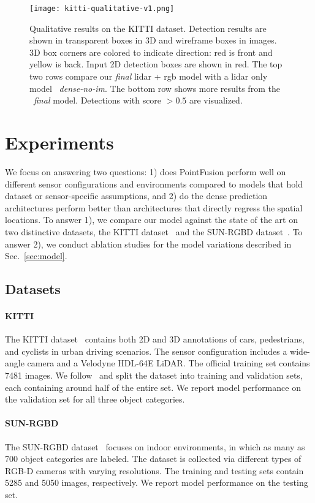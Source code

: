 \documentclass[10pt,twocolumn,letterpaper]{article}
\begin{document}
\begin{figure}[!t]
\centering
\texttt{[image: kitti-qualitative-v1.png]}
\caption{Qualitative results on the KITTI dataset. Detection results are shown in transparent boxes in 3D and wireframe boxes in images. 3D box corners are colored to indicate direction: red is front and yellow is back. Input 2D detection boxes are shown in red. The top two rows compare our \textit{final} lidar + rgb model with a lidar only model ~\textit{dense-no-im}. The bottom row shows more results from the ~\textit{final} model. Detections with score $>0.5$ are visualized.}
\label{fig:kitti-qualitative}
\end{figure}


\section{Experiments}

We focus on answering two questions: 1) does PointFusion perform well on different sensor configurations and environments compared to models that hold dataset or sensor-specific assumptions, and 2) do the dense prediction architectures perform better than architectures that directly regress the spatial locations. To answer 1), we compare our model against the state of the art on two distinctive datasets, the KITTI dataset~\cite{kitti} and the SUN-RGBD dataset~\cite{song2015sun}. To answer 2), we conduct ablation studies for the model variations described in Sec.~\ref{sec:model}.

\subsection{Datasets}
\paragraph{KITTI} The KITTI dataset~\cite{kitti} contains both 2D and 3D annotations of cars, pedestrians, and cyclists in urban driving scenarios. The sensor configuration includes a wide-angle camera and a Velodyne HDL-64E LiDAR. The official training set contains 7481 images. We follow~\cite{mv3d} and split the dataset into training and validation sets, each containing around half of the entire set. We report model performance on the validation set for all three
object categories.  

\paragraph{SUN-RGBD} The SUN-RGBD dataset~\cite{song2015sun} focuses on indoor environments, in which as many as 700 object categories are labeled. The dataset is collected via different types of RGB-D cameras with varying resolutions. The training and testing sets contain 5285 and 5050 images, respectively. We report model performance on the testing set.
\end{document}
